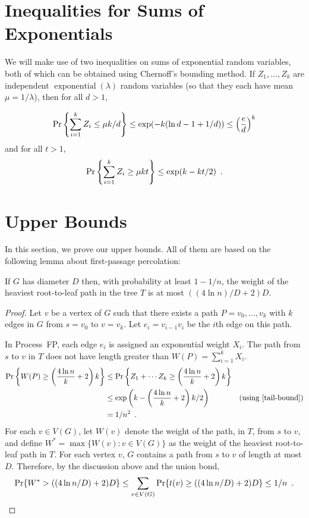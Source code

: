 \documentclass[lotsofwhite]{patmorin}
\DeclareMathOperator{\exponential}{exponential}
\begin{document}
\section{Inequalities for Sums of Exponentials}

We will make use of two inequalities on sums of exponential random
variables, both of which can be obtained using Chernoff's bounding
method.  If $Z_1,\ldots,Z_k$ are independent $\exponential(\lambda)$
random variables (so that they each have mean $\mu=1/\lambda$), then
for all $d>1$,

\begin{equation}
    \Pr\left\{\sum_{i=1}^k Z_i \le \mu k/d\right\} \le \exp(-k(\ln d -1 + 1/d)) \le \left(\frac{e}{d}\right)^k  \eqlabel{head-bound}
\end{equation}
and for all $t>1$, 
\begin{equation}
    \Pr\left\{\sum_{i=1}^k Z_i \ge \mu k t\right\} \le \exp (k-kt/2) \enspace . \eqlabel{tail-bound}
\end{equation}


\section{Upper Bounds}

In this section, we prove our upper bounds. All of them are based on
the following lemma about first-passage percolation:

\begin{lem}
  If $G$ has diameter $D$ then, with probability at least $1-1/n$,
  the weight of the heaviest root-to-leaf path in the tree $T$ is
  at most $((4\ln n)/D+2)D$.
\end{lem}


\begin{proof}
  Let $v$ be a vertex of $G$ such that there exists a path
  $P=v_0,\ldots,v_k$ with $k$ edges in $G$ from $s=v_0$ to $v=v_k$.
  Let $e_i=v_{i-1}v_i$ be the $i$th edge on this path.

  In Process~FP, each edge $e_i$ is assigned an exponential weight $X_i$.
  The path from $s$ to $v$ in $T$ does not have length greater than
  $W(P)=\sum_{i=1}^k X_i$.
  \begin{align*}
      \Pr\left\{W(P)\ge \left(\frac{4\ln n}{k}+2\right)k\right\} 
        & \le \Pr\left\{Z_1+\cdots Z_k\ge \left(\frac{4\ln n}{k}+2\right)k\right\} \\ 
        & \le \exp\left(k - \left(\frac{4\ln n}{k}+2\right)k/2\right) 
            & \text{(using \eqref{tail-bound})} \\
      & = 1/n^2 \enspace .
  \end{align*}
  For each $v\in V(G)$, let $W(v)$ denote the weight of the path, in
  $T$, from $s$ to $v$, and define $W^*=\max\{W(v):v\in V(G)\}$  as the
  weight of the heaviest root-to-leaf path in $T$.  For each vertex $v$,
  $G$ contains a path from $s$ to $v$ of length at most $D$. Therefore,
  by the discussion above and the union bond,
  \[
      \Pr\{W^*> ((4\ln n/D)+2)D\} \le \sum_{v\in V(G)}\Pr\{t(v) \ge ((4\ln n/D)+2)D\}     
       \le 1/n \enspace . \qedhere
  \]
\end{proof}
\end{document}
